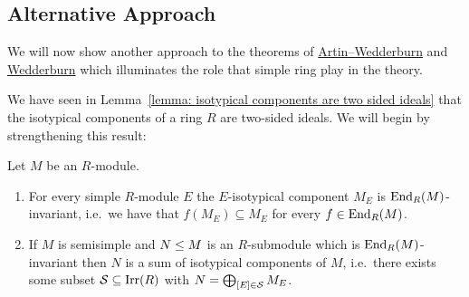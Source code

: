 \subsection{Alternative Approach}


\begin{fluff}
  We will now show another approach to the theorems of \hyperref[theorem: artin wedderburn theorem]{Artin--Wedderburn} and \hyperref[theorem: wedderburns theorem]{Wedderburn} which illuminates the role that simple ring play in the theory.
  
  We have seen in Lemma~\ref{lemma: isotypical components are two sided ideals} that the isotypical components of a ring $R$ are two-sided ideals.
  We will begin by strengthening this result:
\end{fluff}


\begin{lemma}
  \label{lemma: decomposition of module into End tensor R modules}
  Let $M$ be an $R$-module.
  \begin{enumerate}
    \item
      For every simple $R$-module $E$ the $E$-isotypical component $M_E$ is $\operatorname{End}_R(M)$-in\-vari\-ant, i.e.\ we have that $f(M_E) \subseteq M_E$ for every $f \in \operatorname{End}_R(M)$.
    \item
      If $M$ is semisimple and $N \leq M$ is an $R$-submodule which is $\operatorname{End}_R(M)$-invariant then $N$ is a sum of isotypical components of $M$, i.e.\ there exists some subset $\mathcal{S} \subseteq \operatorname{Irr}(R)$ with $N = \bigoplus_{[E] \in \mathcal{S}} M_E$.
  \end{enumerate}
\end{lemma}


